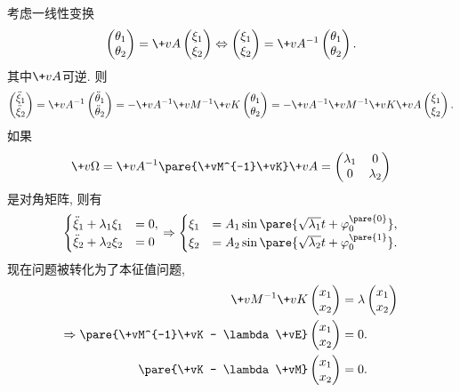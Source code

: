 \documentclass[../LectureNotes.tex]{subfiles}
\begin{document}
考虑一线性变换
\[ \begin{pmatrix}
    \theta_1 \\
    \theta_2
\end{pmatrix} = \+vA \begin{pmatrix}
    \xi_1 \\
    \xi_2
\end{pmatrix}\Leftrightarrow \begin{pmatrix}
    \xi_1 \\
    \xi_2
\end{pmatrix} = \+vA^{-1}\begin{pmatrix}
    \theta_1 \\
    \theta_2
\end{pmatrix}. \]
其中$\+vA$可逆. 则
\[ \begin{pmatrix}
    \ddot{\xi}_1 \\ \ddot{\xi}_2
\end{pmatrix} = \+vA^{-1} \begin{pmatrix}
    \ddot{\theta}_1 \\ \ddot{\theta}_2
\end{pmatrix} = -\+vA^{-1}\+vM^{-1}\+vK \begin{pmatrix}
    \theta_1\\\theta_2
\end{pmatrix} = -\+vA^{-1} \+vM^{-1}\+vK\+vA \begin{pmatrix}
    \xi_1 \\
    \xi_2
\end{pmatrix}. \]
如果
\[ \+v\Omega = \+vA^{-1}\pare{\+vM^{-1}\+vK}\+vA = \begin{pmatrix}
    \lambda_1 & 0 \\
    0 & \lambda_2
\end{pmatrix} \]
是对角矩阵, 则有
\[ \begin{cases}
    \ddot{\xi}_1 + \lambda_1 \xi_1 &= 0, \\
    \ddot{\xi}_2 + \lambda_2 \xi_2 &= 0
\end{cases}\Rightarrow \begin{cases}
    \xi_1 &= A_1 \sin\pare{\sqrt{\lambda_1} t + \varphi_0^{\pare{0}}}, \\
    \xi_2 &= A_2 \sin\pare{\sqrt{\lambda_2} t + \varphi_0^{\pare{1}}}.
\end{cases} \]
现在问题被转化为了本征值问题,
\begin{align*}
    \+vM^{-1}\+vK \begin{pmatrix}
    x_1 \\ x_2
\end{pmatrix} &= \lambda \begin{pmatrix}
    x_1 \\ x_2
\end{pmatrix} \\
\Rightarrow \pare{\+vM^{-1}\+vK - \lambda\+vE} \begin{pmatrix}
    x_1 \\ x_2
\end{pmatrix} &= 0. \\
\pare{\+vK - \lambda\+vM} \begin{pmatrix}
    x_1 \\ x_2
\end{pmatrix} &= 0.
\end{align*}
\end{document}
